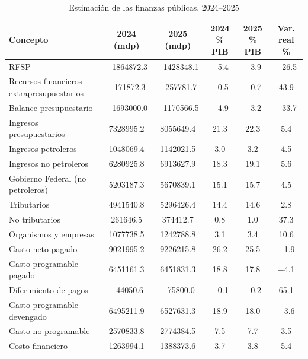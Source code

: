 \begin{table}[htbp]
\centering
\caption{Estimación de las finanzas públicas, 2024--2025}
\label{tab:C4_1}
\footnotesize
\setlength{\tabcolsep}{4pt}
\begin{tabular}{L{4.2cm}SSSSS}
\toprule
{Concepto} & {2024 (mdp)} & {2025 (mdp)} & {2024 \% PIB} & {2025 \% PIB} & {Var. real \%} \\
\midrule
{RFSP} & \num{-1864872.3} & \num{-1428348.1} & \num{-5.4} & \num{-3.9} & \num{-26.5} \\
{Recursos financieros extrapresupuestarios} & \num{-171872.3} & \num{-257781.7} & \num{-0.5} & \num{-0.7} & \num{43.9} \\
{Balance presupuestario} & \num{-1693000.0} & \num{-1170566.5} & \num{-4.9} & \num{-3.2} & \num{-33.7} \\
{Ingresos presupuestarios} & \num{7328995.2} & \num{8055649.4} & \num{21.3} & \num{22.3} & \num{5.4} \\
{Ingresos petroleros} & \num{1048069.4} & \num{1142021.5} & \num{3.0} & \num{3.2} & \num{4.5} \\
{Ingresos no petroleros} & \num{6280925.8} & \num{6913627.9} & \num{18.3} & \num{19.1} & \num{5.6} \\
{Gobierno Federal (no petroleros)} & \num{5203187.3} & \num{5670839.1} & \num{15.1} & \num{15.7} & \num{4.5} \\
{Tributarios} & \num{4941540.8} & \num{5296426.4} & \num{14.4} & \num{14.6} & \num{2.8} \\
{No tributarios} & \num{261646.5} & \num{374412.7} & \num{0.8} & \num{1.0} & \num{37.3} \\
{Organismos y empresas} & \num{1077738.5} & \num{1242788.8} & \num{3.1} & \num{3.4} & \num{10.6} \\
{Gasto neto pagado} & \num{9021995.2} & \num{9226215.8} & \num{26.2} & \num{25.5} & \num{-1.9} \\
{Gasto programable pagado} & \num{6451161.3} & \num{6451831.3} & \num{18.8} & \num{17.8} & \num{-4.1} \\
{Diferimiento de pagos} & \num{-44050.6} & \num{-75800.0} & \num{-0.1} & \num{-0.2} & \num{65.1} \\
{Gasto programable devengado} & \num{6495211.9} & \num{6527631.3} & \num{18.9} & \num{18.0} & \num{-3.6} \\
{Gasto no programable} & \num{2570833.8} & \num{2774384.5} & \num{7.5} & \num{7.7} & \num{3.5} \\
{Costo financiero} & \num{1263994.1} & \num{1388373.6} & \num{3.7} & \num{3.8} & \num{5.4} \\

\end{tabular}
\end{table}
